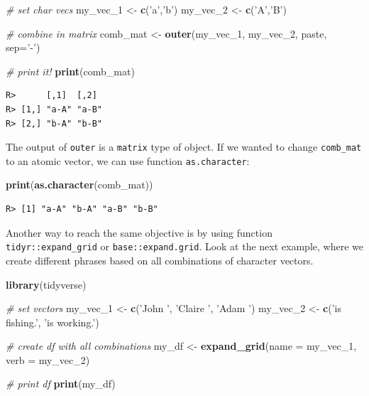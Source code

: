 \documentclass[
  12pt,
]{book}
\newenvironment{Shaded}{\begin{snugshade}}{\end{snugshade}}
\newcommand{\CommentTok}[1]{\textcolor[rgb]{0.37,0.37,0.37}{\textit{#1}}}
\newcommand{\DataTypeTok}[1]{\textcolor[rgb]{0.27,0.27,0.27}{#1}}
\newcommand{\DecValTok}[1]{\textcolor[rgb]{0.06,0.06,0.06}{#1}}
\newcommand{\KeywordTok}[1]{\textcolor[rgb]{0.27,0.27,0.27}{\textbf{#1}}}
\newcommand{\NormalTok}[1]{#1}
\newcommand{\StringTok}[1]{\textcolor[rgb]{0.5,0.5,0.5}{#1}}
\begin{document}
\begin{Shaded}
\begin{Highlighting}[]
\CommentTok{# set char vecs}
\NormalTok{my_vec_}\DecValTok{1}\NormalTok{ <-}\StringTok{ }\KeywordTok{c}\NormalTok{(}\StringTok{'a'}\NormalTok{,}\StringTok{'b'}\NormalTok{)}
\NormalTok{my_vec_}\DecValTok{2}\NormalTok{ <-}\StringTok{ }\KeywordTok{c}\NormalTok{(}\StringTok{'A'}\NormalTok{,}\StringTok{'B'}\NormalTok{)}

\CommentTok{# combine in matrix}
\NormalTok{comb_mat <-}\StringTok{ }\KeywordTok{outer}\NormalTok{(my_vec_}\DecValTok{1}\NormalTok{, my_vec_}\DecValTok{2}\NormalTok{, paste, }\DataTypeTok{sep=}\StringTok{'-'}\NormalTok{)}

\CommentTok{# print it!}
\KeywordTok{print}\NormalTok{(comb_mat)}
\end{Highlighting}
\end{Shaded}

\begin{verbatim}
R>      [,1]  [,2] 
R> [1,] "a-A" "a-B"
R> [2,] "b-A" "b-B"
\end{verbatim}

The output of \texttt{outer} is a \texttt{matrix} type of object. If we wanted to change \texttt{comb\_mat} to an atomic vector, we can use function \texttt{as.character}:

\begin{Shaded}
\begin{Highlighting}[]
\KeywordTok{print}\NormalTok{(}\KeywordTok{as.character}\NormalTok{(comb_mat))}
\end{Highlighting}
\end{Shaded}

\begin{verbatim}
R> [1] "a-A" "b-A" "a-B" "b-B"
\end{verbatim}

Another way to reach the same objective is by using function \texttt{tidyr::expand\_grid} or \texttt{base::expand.grid}. Look at the next example, where we create different phrases based on all combinations of character vectors.

\begin{Shaded}
\begin{Highlighting}[]
\KeywordTok{library}\NormalTok{(tidyverse)}

\CommentTok{# set vectors}
\NormalTok{my_vec_}\DecValTok{1}\NormalTok{ <-}\StringTok{ }\KeywordTok{c}\NormalTok{(}\StringTok{'John '}\NormalTok{, }\StringTok{'Claire '}\NormalTok{, }\StringTok{'Adam '}\NormalTok{)}
\NormalTok{my_vec_}\DecValTok{2}\NormalTok{ <-}\StringTok{ }\KeywordTok{c}\NormalTok{(}\StringTok{'is fishing.'}\NormalTok{, }\StringTok{'is working.'}\NormalTok{)}

\CommentTok{# create df with all combinations}
\NormalTok{my_df <-}\StringTok{ }\KeywordTok{expand_grid}\NormalTok{(}\DataTypeTok{name =}\NormalTok{ my_vec_}\DecValTok{1}\NormalTok{,}
                     \DataTypeTok{verb =}\NormalTok{ my_vec_}\DecValTok{2}\NormalTok{)}

\CommentTok{# print df}
\KeywordTok{print}\NormalTok{(my_df)}
\end{Highlighting}
\end{Shaded}
\end{document}
